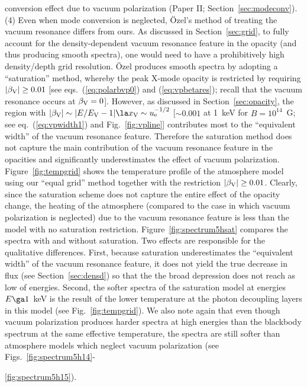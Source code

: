 \documentclass{mn2e}
\newcommand{\uel}{u_{\rm e}}
\newcommand{\Evp}{E_{\rm V}}
\newcommand{\polarbvp}{\beta_{\rm V}}
\newcommand{\laiho}{Paper II}
\begin{document}
{conversion effect due to vacuum polarization
(\laiho; Section~\ref{sec:modeconv}).
(4) Even when mode conversion is neglected, \"{O}zel's method of
treating the vacuum resonance differs from ours.  As discussed
in Section~\ref{sec:grid}, to fully account for the density-dependent
vacuum resonance feature in the opacity (and thus producing smooth
spectra), one would need to have a prohibitively high density/depth
grid resolution.
\"{O}zel produces smooth spectra by adopting a ``saturation'' method,
whereby the peak X-mode opacity is restricted by requiring
$|\polarbvp|\ge 0.01$
[see eqs.~(\ref{eq:polarbvp0}) and (\ref{eq:vpbetares}); recall
that the vacuum resonance occurs at $\polarbvp=0$].
However, as discussed in Section~\ref{sec:opacity}, the region
with $|\polarbvp|\sim |E/\Evp-1|\la x_{\rm V}\sim\uel^{-1/2}$
[$\sim 0.001$ at 1~keV for $B=10^{14}$~G; see eq.~(\ref{eq:vpwidth1})
and Fig.~\ref{fig:vpline}]
contributes most to the ``equivalent width'' of the vacuum
resonance feature.  Therefore the saturation method does not
capture the main contribution of the vacuum resonance feature in
the opacities and significantly underestimates the effect of
vacuum polarization.
Figure~\ref{fig:tempgrid} shows the temperature profile of the
atmosphere model using our ``equal grid'' method together with
the restriction $|\polarbvp|\ge 0.01$.  Clearly, since the
saturation scheme does not capture the entire effect of the
opacity change, the heating of the atmosphere (compared to the
case in which vacuum polarization is neglected) due to the
vacuum resonance feature is less than the model with no
saturation restriction.
Figure~\ref{fig:spectrum5hsat} compares the spectra with and
without saturation.
Two effects are responsible for the qualitative differences.
First, because saturation underestimates the ``equivalent width''
of the vacuum resonance feature, it does not yield the true decrease
in flux (see Section~\ref{sec:densd}) so that the
the broad depression does not reach as low of energies.  Second,
the softer spectra of the saturation model at energies $E\ga 1$~keV
is the result of the lower temperature at the photon decoupling layers
in this model (see Fig.~\ref{fig:tempgrid}).
We also note again that even though vacuum polarization
produces harder spectra at high energies than the blackbody spectrum at
the same effective temperature, the spectra are still softer than
atmosphere models which neglect vacuum polarization
(see Figs.~\ref{fig:spectrum5h14}-{\ref{fig:spectrum5h15}).

}}
\end{document}
